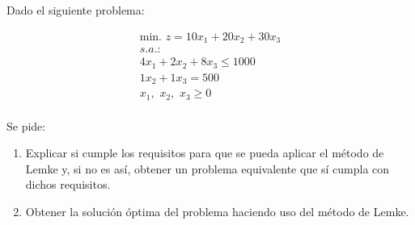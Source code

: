 Dado el siguiente problema:

\begin{equation}
\begin{split}
\mbox{min. } z = 10x_1 + 20x_2 + 30x_3\\
s.a.:\\
4x_1 + 2x_2 + 8x_3 \leq 1000\\
1x_2 + 1x_3 = 500\\
x_1,\,\,x_2,\,\,x_3\geq 0\\
\end{split}
\end{equation}

Se pide:
\begin{enumerate}
    \item Explicar si cumple los requisitos para que se pueda aplicar el método de Lemke y, si no es así, obtener un problema equivalente que sí cumpla con dichos requisitos.
    \item Obtener la solución óptima del problema haciendo uso del método de Lemke.
\end{enumerate}